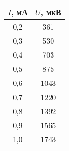 \begin{table}[h!]
    \begin{center}
        \begin{tabular}{|c|c|}
            \hline
            $I$, мА & $U$, мкВ \\ \hline
            0,2     & 361      \\ \hline
            0,3     & 530      \\ \hline
            0,4     & 703      \\ \hline
            0,5     & 875      \\ \hline
            0,6     & 1043     \\ \hline
            0,7     & 1220     \\ \hline
            0,8     & 1392     \\ \hline
            0,9     & 1565     \\ \hline
            1,0     & 1743     \\ \hline
        \end{tabular}
    \end{center}
    \caption{}
\end{table}